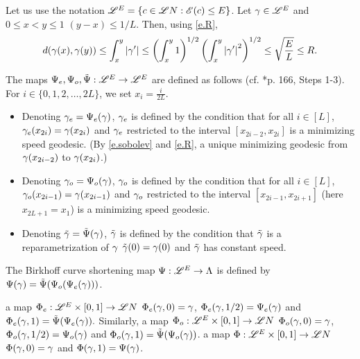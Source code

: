 \documentclass[11pt,twoside]{article}
\begin{document}
Let us use the notation \(\mathscr{L}^E=\{c\in\mathscr{L} N: \mathscr{E}(c)\leq E\}\). Let \(\gamma\in\mathscr{L}^E\) and \(0\leq x<y\leq 1\) \w \((y-x)\leq 1/L\). Then, using \eqref{e.R},
\begin{equation}\label{e.sobolev}
d(\gamma(x),\gamma(y))\leq \int_{x}^{y}\left|\gamma'\right|\leq \left(\int_{x}^{y} 1\right)^{1/2}\left(\int_{x}^{y}\left|\gamma '\right|^2\right)^{1/2}\leq \sqrt{\frac{E}{L}}\leq R.
\end{equation}

\begin{defn}\label{d.Ps}

The maps \(\Psi_e,\Psi_o,\tilde{\Psi}:\mathscr{L}^E\rightarrow\mathscr{L}^E\) are defined as follows (cf. \cite{CM_book}*{p. 166, Steps 1-3}). For \(i\in\{0,1,2,\dots,2L\}\), we set \(x_i=\frac{i}{2L}\).
\begin{itemize}
	\item Denoting \(\gamma_e=\Psi_e(\gamma)\), \(\gamma_e\) is defined by the condition that for all \(i\in[L]\), \(\gamma_e(x_{2i})=\gamma(x_{2i})\) and \(\gamma_e\) restricted to the interval \([x_{2i-2},x_{2i}]\) is a minimizing \cn speed geodesic. (By \eqref{e.sobolev} and \eqref{e.R}, \tes a unique minimizing geodesic from $\gamma(x_{2i-2})$ to \(\gamma(x_{2i})\).)
	\item Denoting \(\gamma_o=\Psi_o(\gamma)\), \(\gamma_o\) is defined by the condition that for all \(i\in[L]\), \(\gamma_o(x_{2i-1})=\gamma(x_{2i-1})\) and \(\gamma_o\) restricted to the interval \([x_{2i-1},x_{2i+1}]\) (here $x_{2L+1}=x_1$) is a minimizing \cn speed geodesic.
	\item Denoting \(\tilde{\gamma}=\tilde{\Psi}(\gamma)\), \(\tilde{\gamma}\) is defined by the condition that \(\tilde{\gamma}\) is a reparametrization of \(\gamma\) \sot \(\tilde{\gamma}(0)=\gamma(0)\) and \(\tilde{\gamma}\) has constant speed. 
\end{itemize}
The Birkhoff curve shortening map \(\Psi:\mathscr{L}^E \rightarrow \Lambda\) is defined by $\Psi(\gamma)=\tilde{\Psi}(\Psi_o(\Psi_e(\gamma)))$.
	
\end{defn}

\begin{pro}\label{p.Ph}
	\Tes a \cts map \(\Phi_e:\mathscr{L}^E\times[0,1]\rightarrow \mathscr{L} N\) \st \(\Phi_e(\gamma,0)=\gamma\), \(\Phi_e(\gamma,1/2)=\Psi_e(\gamma)\) and \(\Phi_e(\gamma,1)=\tilde{\Psi}(\Psi_e(\gamma)).\) Similarly, \tes  a \cts map \(\Phi_o:\mathscr{L}^E\times[0,1]\rightarrow \mathscr{L} N\) \st \(\Phi_o(\gamma,0)=\gamma\), \(\Phi_o(\gamma,1/2)=\Psi_o(\gamma)\) and \(\Phi_o(\gamma,1)=\tilde{\Psi}(\Psi_o(\gamma))\). \tf \tes a \cts map \(\Phi:\mathscr{L}^E\times[0,1]\rightarrow \mathscr{L} N\) \st \(\Phi(\gamma,0)=\gamma\) and \(\Phi(\gamma,1)=\Psi(\gamma)\).
\end{pro}
\end{document}
